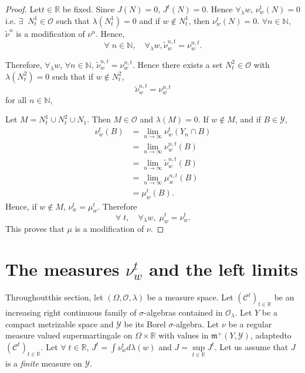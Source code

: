 \begin{proof}
Let\pageoriginale $t \in\mathbb{R}$ be fixed. Since $J(N) = 0$, $J^t
(N) =0$. Hence $\forall_\lambda w$, $\nu^t_w(N) =0$ i.e. $\exists \;\; 
N^1_t\in \mathscr{O}$ such that $\lambda(N^1_t) =0$ and if $w \not\in
N^1_t$, then $\nu^t_w(N) =0$. $\forall n \in\mathbb{N}$,
$\tilde{\nu}^n$ is a modification of $\nu^n$. Hence,
$$
\forall \; n \in \mathbb{N}, \quad \forall_\lambda w,
\tilde{\nu}_w^{n,t} = \nu^{n,t}_w.
 $$

Therefore, $\forall_\lambda w$, $\forall n \in\mathbb{N}$,
$\tilde{\nu}^{n,t}_w  = \nu^{n,t}_w$. Hence there exists a set $N^2_t
\in \mathscr{O}$ with $\lambda(N^2_t) =0$ such that if $w \not\in
N^2_t$,
$$
\tilde{\nu}^{n,t}_w = \nu^{n,t}_w
$$
for all $n \in \mathbb{N}$,

Let $M = N^1_t \cup N^2_t \cup N_1$. Then $M \in \mathscr{O}$ and
$\lambda(M) =0$. If $w \not\in M$, and if $B \in\mathscr{Y}$,
\begin{align*}
\nu^t_w(B) & = \lim\limits_{n \to \infty} \nu^t_w(Y_n \cap B)\\
& = \lim\limits_{n \to \infty} \nu^{n,t}_w(B)\\
& = \lim\limits_{n \to \infty} \tilde{\nu}^{n,t}_w(B)\\
& = \lim\limits_{n \to \infty} \mu^{n,t}_w(B)\\
& = \mu^t_w(B).
\end{align*}
Hence, if $w \not\in M$, $\nu^t_w = \mu^t_w$. Therefore
$$
\forall \; t, \quad \forall_\lambda w, \; \mu^t_w = \nu^t_w. 
$$
This proves that $\mu$ is a modification of $\nu$. 
\end{proof}

\section{The measures $\nu^t_w$ and the left limits}\label{part2:chap5:sec3}

Throughout\pageoriginale this section, let $(\Omega, \mathscr{O},
\lambda)$ be a measure space. Let $(\mathscr{C}^t)_{t \in \mathbb{R}}$
be an increasing right continuous family of $\sigma$-algebras
contained in $\hat{\mathscr{O}}_\lambda$. Let $Y$ be a compact
metrizable space and $\mathscr{Y}$ be its Borel $\sigma$-algebra. Let
$\nu$ be a regular measure valued supermartingale on $\Omega \times
\mathbb{R}$ with values in $\mathfrak{m}^+ (Y, \mathscr{Y})$,
adapted\pageoriginale to $(\mathscr{C}^t)_{t \in\mathbb{R}}$. Let
$\forall \; t \in\mathbb{R}$, $J^t = \int \nu^t_wd\lambda(w)$ and $J
=\sup\limits_{t \in \mathbb{R}} J^t$. Let us assume that $J$ is a {\em
finite} measure on $\mathscr{Y}$. 

